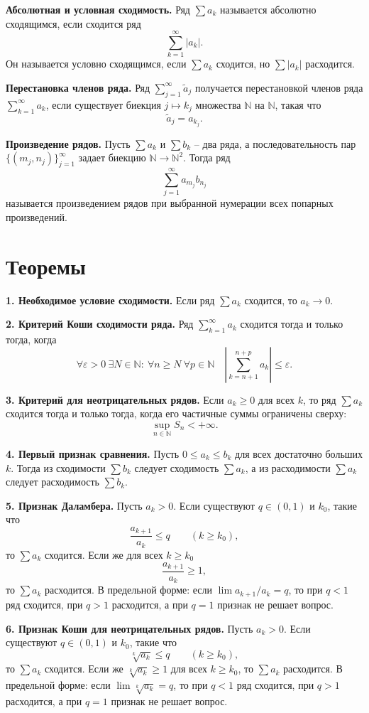 \documentclass[12pt,a4paper]{article}
\newcommand{\N}{\mathbb{N}}
\newcommand{\eps}{\varepsilon}
\begin{document}
\textbf{Абсолютная и условная сходимость.}
Ряд \(\sum a_k\) называется абсолютно сходящимся, если сходится ряд
\[
  \sum_{k=1}^{\infty}|a_k|.
\]
Он называется условно сходящимся, если \(\sum a_k\) сходится, но
\(\sum |a_k|\) расходится.

\textbf{Перестановка членов ряда.}
Ряд \(\sum_{j=1}^{\infty}\widetilde a_j\) получается перестановкой членов
ряда \(\sum_{k=1}^{\infty}a_k\), если существует биекция
\(j\mapsto k_j\) множества \(\N\) на \(\N\), такая что
\[
  \widetilde a_j=a_{k_j}.
\]

\textbf{Произведение рядов.}
Пусть \(\sum a_k\) и \(\sum b_k\) -- два ряда, а последовательность пар
\(\{(m_j,n_j)\}_{j=1}^{\infty}\) задает биекцию \(\N\to\N^2\). Тогда ряд
\[
  \sum_{j=1}^{\infty} a_{m_j}b_{n_j}
\]
называется произведением рядов при выбранной нумерации всех попарных
произведений.

\section*{Теоремы}

\textbf{1. Необходимое условие сходимости.}
Если ряд \(\sum a_k\) сходится, то \(a_k\to0\).

\textbf{2. Критерий Коши сходимости ряда.}
Ряд \(\sum_{k=1}^{\infty}a_k\) сходится тогда и только тогда, когда
\[
  \forall\eps>0\ \exists N\in\N:\ \forall n\ge N\ \forall p\in\N
  \quad
  \left|\sum_{k=n+1}^{n+p}a_k\right|\le\eps.
\]

\textbf{3. Критерий для неотрицательных рядов.}
Если \(a_k\ge0\) для всех \(k\), то ряд \(\sum a_k\) сходится тогда и только
тогда, когда его частичные суммы ограничены сверху:
\[
  \sup_{n\in\N}S_n<+\infty.
\]

\textbf{4. Первый признак сравнения.}
Пусть \(0\le a_k\le b_k\) для всех достаточно больших \(k\). Тогда из
сходимости \(\sum b_k\) следует сходимость \(\sum a_k\), а из расходимости
\(\sum a_k\) следует расходимость \(\sum b_k\).

\textbf{5. Признак Даламбера.}
Пусть \(a_k>0\). Если существуют \(q\in(0,1)\) и \(k_0\), такие что
\[
  \frac{a_{k+1}}{a_k}\le q\qquad (k\ge k_0),
\]
то \(\sum a_k\) сходится. Если же для всех \(k\ge k_0\)
\[
  \frac{a_{k+1}}{a_k}\ge1,
\]
то \(\sum a_k\) расходится. В предельной форме: если
\(\lim a_{k+1}/a_k=q\), то при \(q<1\) ряд сходится, при \(q>1\) расходится,
а при \(q=1\) признак не решает вопрос.

\textbf{6. Признак Коши для неотрицательных рядов.}
Пусть \(a_k>0\). Если существуют \(q\in(0,1)\) и \(k_0\), такие что
\[
  \sqrt[k]{a_k}\le q\qquad (k\ge k_0),
\]
то \(\sum a_k\) сходится. Если же \(\sqrt[k]{a_k}\ge1\) для всех
\(k\ge k_0\), то \(\sum a_k\) расходится. В предельной форме: если
\(\lim\sqrt[k]{a_k}=q\), то при \(q<1\) ряд сходится, при \(q>1\) расходится,
а при \(q=1\) признак не решает вопрос.
\end{document}
